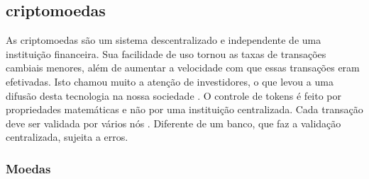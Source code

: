 \documentclass[
article,			%
12pt,				%
openright,			%
oneside,			%
a4paper,			%
chapter=TITLE,		%
section=TITLE,		%
subsection=TITLE,	%
subsubsection=TITLE,%
subsubsubsection=TITLE, %
english,			%
brazil,				%
]{abntex2}
\begin{document}

\subsection{criptomoedas}

As criptomoedas são um sistema descentralizado e independente de uma
instituição financeira. Sua facilidade de uso tornou as taxas de
transações cambiais menores, além de aumentar a velocidade com que
essas transações eram efetivadas. Isto chamou muito a atenção de
investidores, o que levou a uma difusão desta tecnologia na nossa
sociedade \cite{Nakamoto2008, Prado2017}. O controle de tokens é feito
por propriedades matemáticas e não por uma instituição centralizada.
Cada transação deve ser validada por vários nós \cite{LChicarino}.
Diferente de um banco, que faz a validação centralizada, sujeita a
erros.

\subsubsection{Moedas}

\label{cap:definicao-blockchain}
\end{document}
